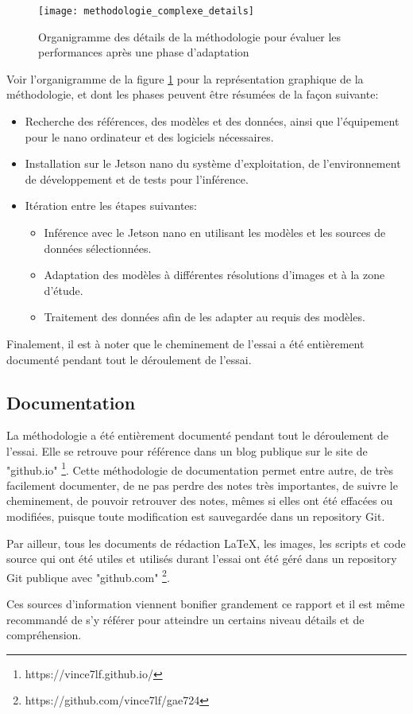 \label{methodologie_complexe_details}
\begin{figure}[H]
    \centering
    \texttt{[image: methodologie\_complexe\_details]}
    \caption{Organigramme des détails de la méthodologie pour évaluer les performances après une phase d'adaptation}
    \label{fig:methodologie_complexe_details}
\end{figure}
\par Voir l'organigramme de la figure \ref{fig:methodologie_complexe_details} pour la représentation graphique de la méthodologie, et dont les phases peuvent être résumées de la façon suivante:  
\begin{itemize}
   \item Recherche des références, des modèles et des données, ainsi que l'équipement pour le nano ordinateur et des logiciels nécessaires.
   \item Installation sur le Jetson nano du système d'exploitation, de l'environnement de développement et de tests pour l'inférence.
   \item Itération entre les étapes suivantes:
   \begin{itemize}
      \item Inférence avec le Jetson nano en utilisant les modèles et les sources de données sélectionnées.
      \item Adaptation des modèles à différentes résolutions d'images et à la zone d'étude.
      \item Traitement des données afin de les adapter au requis des modèles.
   \end{itemize}
\end{itemize}
\par Finalement, il est à noter  que le cheminement de l'essai a été entièrement documenté pendant tout le déroulement de l'essai.
\subsection{Documentation}
\par La méthodologie a été entièrement documenté pendant tout le déroulement de l'essai. Elle se retrouve pour référence dans un blog publique sur le site de "github.io" \footnote{https://vince7lf.github.io/}. Cette méthodologie de documentation permet entre autre, de très facilement documenter, de ne pas perdre des notes très importantes, de suivre le cheminement, de pouvoir retrouver des notes, mêmes si elles ont été effacées ou modifiées, puisque toute modification est sauvegardée dans un repository Git.
\par Par ailleur, tous les documents de rédaction LaTeX, les images, les scripts et code source qui ont été utiles et utilisés durant l'essai ont été géré dans un repository Git publique avec "github.com" \footnote{https://github.com/vince7lf/gae724}. 
\par Ces sources d'information viennent bonifier grandement ce rapport et il est même recommandé de s'y référer pour atteindre un certains niveau détails et de compréhension. 
